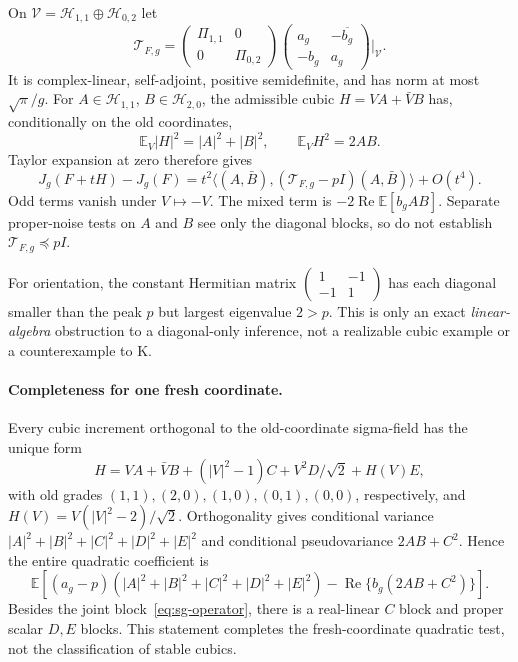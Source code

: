 On $\mathcal V=\mathcal H_{1,1}\oplus\mathcal H_{0,2}$ let
\begin{equation}\label{eq:sg-operator}
 \mathcal T_{F,g}=
 \begin{pmatrix}\Pi_{1,1}&0\\0&\Pi_{0,2}\end{pmatrix}
 \begin{pmatrix}a_g&-\overline{b_g}\\-b_g&a_g\end{pmatrix}
 \bigg|_{\mathcal V}.
\end{equation}
It is complex-linear, self-adjoint, positive semidefinite, and has norm
at most $\sqrt\pi/g$.
For $A\in\mathcal H_{1,1}$, $B\in\mathcal H_{2,0}$, the admissible cubic
$H=VA+\bar V B$ has, conditionally on the old coordinates,
\[
 \mathbb E_V|H|^2=|A|^2+|B|^2,
 \qquad \mathbb E_VH^2=2AB.
\]
Taylor expansion at zero therefore gives
\begin{equation}\label{eq:sg-joint-second}
 J_g(F+tH)-J_g(F)
 =t^2\langle(A,\bar B),(\mathcal T_{F,g}-pI)(A,\bar B)\rangle+O(t^4).
\end{equation}
Odd terms vanish under $V\mapsto-V$. The mixed term is
$-2\operatorname{Re}\mathbb E[b_gAB]$. Separate proper-noise tests on
$A$ and $B$ see only the diagonal blocks, so do not establish
$\mathcal T_{F,g}\preceq pI$.

For orientation, the constant Hermitian matrix
$\left(\begin{smallmatrix}1&-1\\-1&1\end{smallmatrix}\right)$ has each
diagonal smaller than the peak $p$ but largest eigenvalue $2>p$.
This is only an exact \emph{linear-algebra} obstruction to a diagonal-only
inference, not a realizable cubic example or a counterexample to K.

\paragraph{Completeness for one fresh coordinate.}
Every cubic increment orthogonal to the old-coordinate sigma-field has
the unique form
\[
 H=VA+\bar V B+(|V|^2-1)C+V^2D/\sqrt2+H(V)E,
\]
with old grades $(1,1),(2,0),(1,0),(0,1),(0,0)$, respectively, and
$H(V)=V(|V|^2-2)/\sqrt2$. Orthogonality gives conditional variance
$|A|^2+|B|^2+|C|^2+|D|^2+|E|^2$ and conditional pseudovariance
$2AB+C^2$. Hence the entire quadratic coefficient is
\[
 \mathbb E[(a_g-p)(|A|^2+|B|^2+|C|^2+|D|^2+|E|^2)
               -\operatorname{Re}\{b_g(2AB+C^2)\}].
\]
Besides the joint block~\eqref{eq:sg-operator}, there is a real-linear
$C$ block and proper scalar $D,E$ blocks. This statement completes the
fresh-coordinate quadratic test, not the classification of stable cubics.

